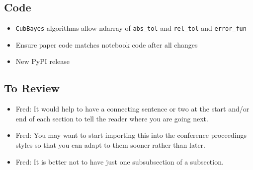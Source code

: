 \documentclass[graybox]{svmult}
\newcommand{\AGSComment}[1]{{\color{brown} #1}}
\newcommand{\FJHComment}[1]{{\color{purple}Fred:  #1}}
\begin{document}
\subsection*{Code}

\begin{itemize}
    \item \AGSComment{\texttt{CubBayes} algorithms allow ndarray of \texttt{abs\_tol} and \texttt{rel\_tol} and \texttt{error\_fun}}
    \item \AGSComment{Ensure paper code matches notebook code after all changes}
    \item \AGSComment{New PyPI release}
\end{itemize}

\subsection*{To Review}

\begin{itemize}
    \item \FJHComment{It would help to have a connecting sentence or two at the start and/or end of each section to tell the reader where you are going next.}
    \item \FJHComment{You may want to start importing this into the conference proceedings styles so that you can adapt to them sooner rather than later.}
    \item \FJHComment{It is better not to have just one subsubsection of a subsection.}
\end{itemize}

\tableofcontents
\end{document}
